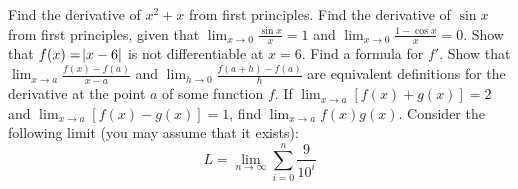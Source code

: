 \begin{questions}
\begin{multicols}{2}
    \end{multicols}
  \questioM Find the derivative of $ x^2 + x $ from first principles.
  \questioE Find the derivative of $ \sin x $ from first principles, given that $ \lim_{x \to 0} \frac{\sin x}{x} = 1 $
            and $ \lim_{x \to 0} \frac{1 - \cos x}{x} = 0 $.
  \questioE Show that $ f(x) = \abs{x - 6} $ is not differentiable at $ x = 6 $. Find a formula for $ f' $.
  \questioE Show that $ \lim_{x \to a} \frac{f(x) - f(a)}{x - a} $ and $ \lim_{h \to 0} \frac{f(a + h) - f(a)}{h} $ are
            equivalent definitions for the derivative at the point $ a $ of some function $ f $.
  \questioE If $ \lim_{x \to a} [f(x) + g(x)] = 2 $ and $ \lim_{x \to a} [f(x) - g(x)] = 1 $, find $ \lim_{x \to a} f(x)g(x) $.
  \questioS Consider the following limit (you may assume that it exists):
            \begin{displaymath}
              L = \lim_{n \to \infty} \sum^n_{i = 0} \frac{9}{10^i}
            \end{displaymath}
\end{questions}
